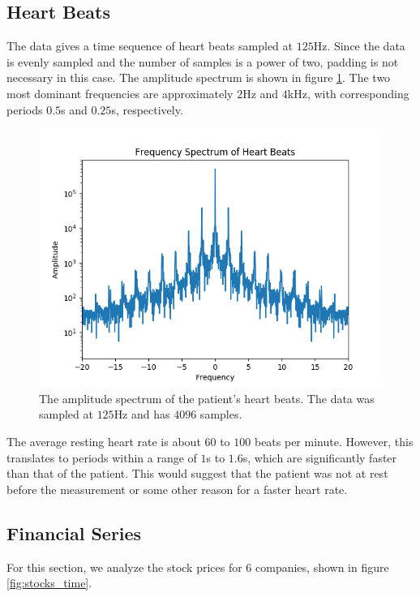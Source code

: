 \documentclass[11pt, letterpage]{article}
\begin{document}
\subsection{Heart Beats}
The data gives a time sequence of heart beats sampled at $125$Hz. Since the data
is evenly sampled and the number of samples is a power of two, padding is not
necessary in this case. The amplitude spectrum is shown in figure
\ref{fig:beats}. The two most dominant frequencies are approximately $2$Hz and
$4$kHz, with corresponding periods $0.5$s and $0.25$s, respectively.

\begin{figure}
  \includegraphics[width=\linewidth]{beats.png}
  \caption{
    The amplitude spectrum of the patient's heart beats. The data was sampled at
    $125$Hz and has $4096$ samples.
  }
  \label{fig:beats}
\end{figure}

The average resting heart rate is about $60$ to $100$ beats per minute. However,
this translates to periods within a range of $1$s to $1.6$s, which are
significantly faster than that of the patient. This would suggest that the
patient was not at rest before the measurement or some other reason for a faster
heart rate.

\subsection{Financial Series}
For this section, we analyze the stock prices for 6 companies, shown in figure
\ref{fig:stocks_time}.
\end{document}
